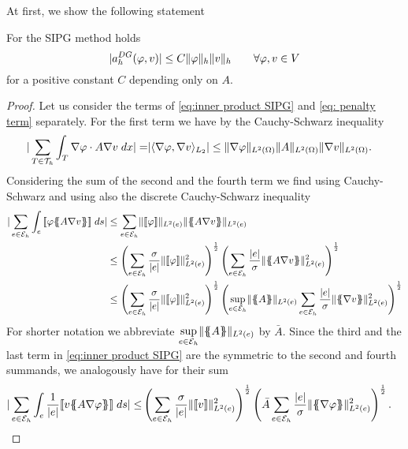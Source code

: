 At first, we show the following statement
\begin{lemma}\label{la: SIPG continuous}
	For the SIPG method holds
	\[
	|a_h^{DG}(\varphi, v) | \leq C \lVert \varphi \rVert_{h} \lVert v \rVert_{h} \qquad \forall \varphi,v \in V
	\]
	for a positive constant $C$ depending only on $A$.
\end{lemma}
\begin{proof}
	Let us consider the terms of \eqref{eq:inner product SIPG} and \eqref{eq: penalty term} separately.
	For the first term we have by the Cauchy-Schwarz inequality
	\begin{align}
	|\sum\limits_{T \in \mathcal{T}_h} \int_{T} {{ \nabla \varphi \cdot A \nabla v}\;dx}| =& |  \langle \nabla \varphi, \nabla v \rangle _{L_2} | \leq \lVert \nabla \varphi \rVert_{L^2(\Omega)} \lVert A \rVert_{L^2(\Omega)} \lVert \nabla v \rVert_{L^2(\Omega)}. \label{eq: CS estimate 0}
	\end{align}
	Considering the sum of the second and the fourth term we find using Cauchy-Schwarz and using also the discrete Cauchy-Schwarz inequality
	\begin{align}
	|\sum\limits_{e \in \edges}\myIntS e { \jump {\varphi \average{A \nabla v} }}| &\leq
	\sum\limits_{e \in \edges}  \LTwonormE{\jump {\varphi}} \LTwonormE {\average{A \nabla v}} \nonumber \\
	& \leq
	\left( \sum\limits_{e \in \edges} \frac {\sigma}{|e|} \LTwonormE{\jump {\varphi}}^2 \right)^{\frac 1 2}
	\left( \sum\limits_{e \in \edges} \frac {|e|} \sigma \LTwonormE{\average{A \nabla v}}^2 \right)^{\frac 1 2} 	 \nonumber \\
	& \leq
	\left( \sum\limits_{e \in \edges} \frac {\sigma}{|e|} \LTwonormE{\jump {\varphi}}^2 \right)^{\frac 1 2}
	 \left( \sup\limits_{e \in \edges} \LTwonormE{\average{A}}\sum\limits_{e \in \edges} \frac {|e|} \sigma \LTwonormE{\average{\nabla v}}^2 \right)^{\frac 1 2} \label{eq: CS estimate}
	\end{align}
	For shorter notation we abbreviate $\sup\limits_{e \in \mathcal{E}_h} \lVert \{\!\!\{ A \}\!\!\} \rVert_{L^2(e)}$ by $\bar A$. Since the third and the last term in \eqref{eq:inner product SIPG} are the symmetric to the second and fourth summands, we analogously have for their sum
	\begin{align}
	|\sum\limits_{e \in \edges}\myIntS e { \frac 1 {|e|}\jump {v \average{A \nabla \varphi} }}| \leq&
	\left( \sum\limits_{e \in \edges} \frac {\sigma}{|e|}\LTwonormE{\jump {v}}^2 \right)^{\frac 1 2}
	\left( \bar A \sum\limits_{e \in \edges} \frac {|e|} \sigma \LTwonormE{\average{\nabla \varphi}}^2 \right)^{\frac 1 2}.\label{eq: CS estimate2}

\end{align}
\end{proof}
